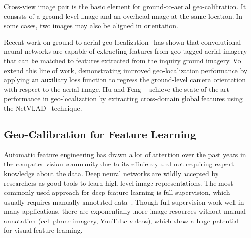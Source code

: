 Cross-view image pair is the basic element for ground-to-aerial
geo-calibration. It consists of a ground-level image and an overhead
image at the same location. In some cases, two images may also be aligned
in orientation. 

Recent work on ground-to-aerial
geo-localization~\cite{lin2013cross,lin2015learning,workman2015geocnn,workman2015wide}
has shown that convolutional neural networks are capable of extracting
features from geo-tagged aerial imagery that can be matched to features extracted
from the inquiry ground imagery.  Vo \etal~\cite{vo2016localizing} extend this
line of work, demonstrating improved geo-localization performance by
applying an auxiliary loss function to regress the ground-level camera
orientation with respect to the aerial image. Hu and Feng
\etal~\cite{mh2018cvm} achieve the state-of-the-art performance in
geo-localization by extracting cross-domain global features using
the NetVLAD~\cite{arandjelovic2016netvlad} technique.


\subsection{Geo-Calibration for Feature Learning}

Automatic feature engineering has drawn a lot of attention over the
past years in the computer vision community due to its efficiency and
not requiring expert knowledge about the data. Deep neural networks
are wildly accepted by researchers as good tools to learn high-level
image representations.
The most commonly used approach for deep feature learning is
full supervision, which usually requires manually annotated
data~\cite{yosinski2014transferable,zhou2016learning,wen2016discriminative}.
Though full supervision work well in many applications, there are
exponentially more image resources without manual annotation (cell
phone imagery, YouTube videos\etc), which show a huge potential for
visual feature learning.   

